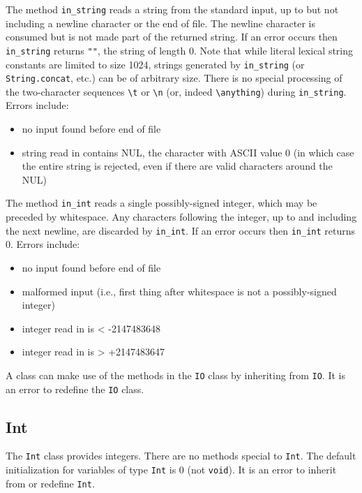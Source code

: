 \documentclass[]{article}
\begin{document}
The method \texttt{in\_string} reads a string from the standard input,
up to but not including a newline character or the end of file. The
newline character is consumed but is not made part of the returned
string. If an error occurs then \texttt{in\_string} returns \texttt{""},
the string of length 0. Note that while literal lexical string constants
are limited to size 1024, strings generated by \texttt{in\_string} (or
\texttt{String.concat}, etc.) can be of arbitrary size. There is no
special processing of the two-character sequences
\texttt{\textbackslash{}t} or \texttt{\textbackslash{}n} (or, indeed
\texttt{\textbackslash{}anything}) during \texttt{in\_string}. Errors
include:

\begin{itemize}
\itemsep1pt\parskip0pt
\item
  no input found before end of file
\item
  string read in contains NUL, the character with ASCII value 0 (in
  which case the entire string is rejected, even if there are valid
  characters around the NUL)
\end{itemize}

The method \texttt{in\_int} reads a single possibly-signed integer,
which may be preceded by whitespace. Any characters following the
integer, up to and including the next newline, are discarded by
\texttt{in\_int}. If an error occurs then \texttt{in\_int} returns 0.
Errors include:

\begin{itemize}
\itemsep1pt\parskip0pt
\item
  no input found before end of file
\item
  malformed input (i.e., first thing after whitespace is not a
  possibly-signed integer)
\item
  integer read in is \textless{} -2147483648
\item
  integer read in is \textgreater{} +2147483647
\end{itemize}

A class can make use of the methods in the \texttt{IO} class by
inheriting from \texttt{IO}. It is an error to redefine the \texttt{IO}
class.

\subsection{Int}

The \texttt{Int} class provides integers. There are no methods special
to \texttt{Int}. The default initialization for variables of type
\texttt{Int} is 0 (not \texttt{void}). It is an error to inherit from or
redefine \texttt{Int}.
\end{document}
